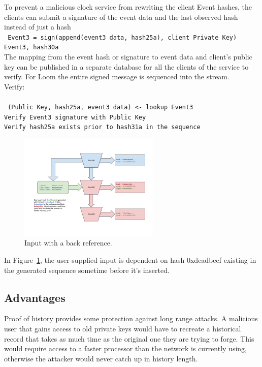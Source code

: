 \documentclass[12pt]{article}
\begin{document}
To prevent a malicious clock service from rewriting the client Event hashes, the clients can submit a signature of the event data and the last observed hash instead of just a hash\\
\texttt{
Event3 = sign(append(event3 data, hash25a), client Private Key)\\
Event3, hash30a\\
}
The mapping from the event hash or signature to event data and client’s public key can be published in a separate database for all the clients of the service to verify. For Loom the entire signed message is sequenced into the stream.\\
\noindent Verify:\\\\\noindent
\texttt{
    (Public Key, hash25a, event3 data) <- lookup Event3 \\
    Verify Event3 signature with Public Key\\
    Verify hash25a exists prior to hash31a in the sequence\\
}

\begin{figure}
  \begin{center}
    \centering
    \includegraphics[width=0.6\textwidth]{figures/fig_6.png}
    \caption[Fig 6]{Input with a back reference.\label{fig:poh_consistency}}
  \end{center}
  \end{figure}

In Figure~\ref{fig:poh_consistency}, the user supplied input is dependent on hash 0xdeadbeef existing in the generated sequence sometime before it’s inserted.
\subsection{Advantages}

Proof of history provides some protection against long range attacks. A malicious user that gains access to old private keys would have to recreate a historical record that takes as much time as the original one they are trying to forge. This would require access to a faster processor than the network is currently using, otherwise the attacker would never catch up in history length.
\end{document}
